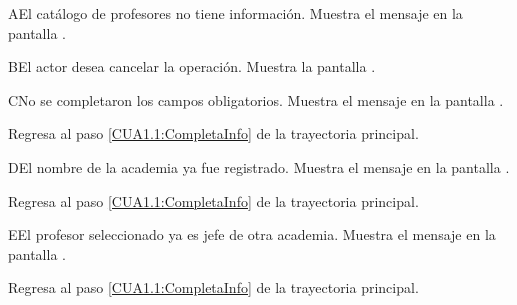 \begin{UCtrayectoriaA}{A}{El catálogo de profesores no tiene información.}
	\UCpaso [\UCsist] Muestra el mensaje  en la pantalla . 
\end{UCtrayectoriaA}

\begin{UCtrayectoriaA}{B}{El actor desea cancelar la operación.}
	\UCpaso [\UCsist] Muestra la pantalla . 
\end{UCtrayectoriaA}

\begin{UCtrayectoriaA}{C}{No se completaron los campos obligatorios.}
	\UCpaso [\UCsist] Muestra el mensaje  en la pantalla .
	
	\UCpaso Regresa al paso \ref{CUA1.1:CompletaInfo} de la trayectoria principal.
\end{UCtrayectoriaA}

\begin{UCtrayectoriaA}{D}{El nombre de la academia ya fue registrado.}
	\UCpaso [\UCsist] Muestra el mensaje  en la pantalla .
	
	\UCpaso Regresa al paso \ref{CUA1.1:CompletaInfo} de la trayectoria principal.
\end{UCtrayectoriaA}

\begin{UCtrayectoriaA}{E}{El profesor seleccionado ya es jefe de otra academia.}
	\UCpaso [\UCsist] Muestra el mensaje  en la pantalla .
	
	\UCpaso Regresa al paso \ref{CUA1.1:CompletaInfo} de la trayectoria principal.
\end{UCtrayectoriaA}


